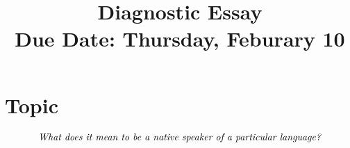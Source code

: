 \documentclass[12pt]{article} %
\title{\textbf{Diagnostic Essay} \\ \textbf{Due Date: } Thursday, Feburary 10}
\date{}
\begin{document}
	\renewcommand*{\coursecode}{MATH 235} %
	\renewcommand*{\assgnnumber}{Assignment 1} %
	\renewcommand*{\submdate}{September 14, 2021} %
	\renewcommand*{\studentfname}{Abdullah} %
	\renewcommand*{\studentlname}{Zubair} %
    \renewcommand*{\proofname}{Proof:}

	\renewcommand\qedsymbol{$\blacksquare$}
	\setfigpath
	\fancyhfoffset[L,O]{0pt} %



\maketitle
	\section{Topic}
  \begin{align*}
    \text{\it{What does it mean to be a native speaker of a particular language?}}
  \end{align*}
\end{document}
